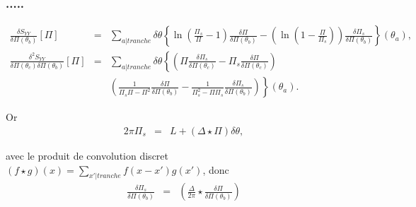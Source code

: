 \subsubsection{.....}
	

	
	\begin{eqnarray}
			\frac{ \delta S_{YY} }{ \delta \Pi(\theta_b)  } [\Pi ]  & = & \sum_{a\vert tranche}   \delta \theta \left \{ \ln \left ( \frac{ \Pi_s}{ \Pi  } - 1 \right )\frac{\delta \Pi  }{ \delta \Pi(\theta_b)} -  \left ( \ln \left ( 1 - \frac{ \Pi}{ \Pi_s }\right ) \right )\frac{\delta \Pi_s  }{ \delta \Pi(\theta_b) } \right \} (\theta_a) ,\\
			\frac{ \delta^2 S_{YY} }{ \delta \Pi(\theta_c) \delta \Pi(\theta_b)  } [\Pi ]  & = & 	\sum_{a \vert tranche}   \delta \theta \left \{ \left ( \Pi  \frac{\delta \Pi_s  }{\delta \Pi ( \theta_c) }- \Pi_s  \frac{\delta \Pi  }{\delta \Pi ( \theta_c ) } \right ) \right.   \\
			&&   \left. \left ( \frac{1}{\Pi_s\Pi  -\Pi^2  }\frac{\delta \Pi }{\delta \Pi(\theta_b) }- \frac{1}{\Pi_s^2  - \Pi \Pi_s }\frac{\delta \Pi_s }{\delta \Pi(\theta_b) } \right )  \right \}(\theta_a).
		\end{eqnarray}
		
	Or 
	\begin{eqnarray}
		2\pi \Pi_s  & = &  L + ( \Delta \star \Pi ) \delta \theta, 		
	\end{eqnarray}
	
	avec le produit de convolution discret $( f \star g )(x) = \sum_{x'\vert tranche } f( x - x') g(x') $, donc 
	\begin{eqnarray}
			\frac{\delta \Pi_s }{\delta \Pi( \theta_b)}   & = &\left  ( \frac{\Delta}{2\pi} \star \frac{\delta \Pi}{\delta \Pi(\theta_b) }  \right )	
		\end{eqnarray}
	
